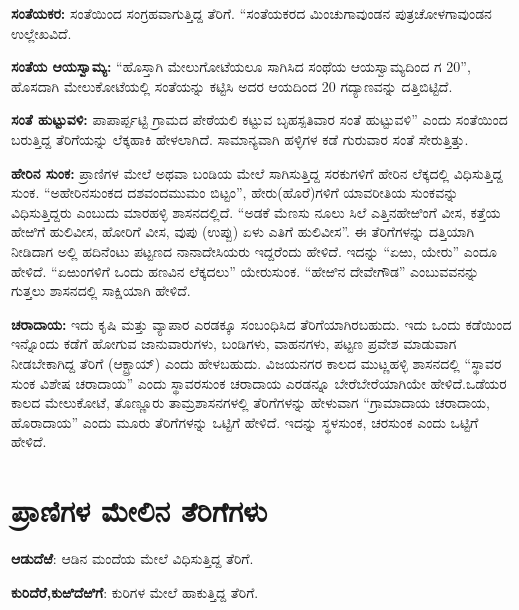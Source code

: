 \textbf{ಸಂತೆಯಕರ: } ಸಂತೆಯಿಂದ ಸಂಗ್ರಹವಾಗುತ್ತಿದ್ದ ತೆರಿಗೆ. “ಸಂತೆಯಕರದ ಮಿಂಚುಗಾವುಂಡನ ಪುತ್ರ\break ಚೋಳಗಾವುಂಡನ ಉಲ್ಲೇಖವಿದೆ.

\textbf{ಸಂತೆಯ ಆಯಸ್ವಾಮ್ಯ:} “ಹೊಸ್ತಾಗಿ ಮೇಲುಗೋಟೆಯಲೂ ಸಾಗಿಸಿದ ಸಂಥೆಯ ಆಯಸ್ವಾಮ್ಯದಿಂದ ಗ 20”, ಹೊಸದಾಗಿ ಮೇಲುಕೋಟೆಯಲ್ಲಿ ಸಂತೆಯನ್ನು ಕಟ್ಟಿಸಿ ಅದರ ಆಯದಿಂದ 20 ಗದ್ಯಾಣವನ್ನು ದತ್ತಿಬಿಟ್ಟಿದೆ.

\textbf{ಸಂತೆ ಹುಟ್ಟುವಳಿ: } ಪಾಪಾರ್ಪ್ಪಟ್ಟಿ ಗ್ರಾಮದ ಪೇಠೆಯಲಿ ಕಟ್ಟುವ ಬೃಹಸ್ಪತಿವಾರ ಸಂತೆ ಹುಟ್ಟುವಳಿ” ಎಂದು ಸಂತೆಯಿಂದ ಬರುತ್ತಿದ್ದ ತೆರಿಗೆಯನ್ನು ಲೆಕ್ಕಹಾಕಿ ಹೇಳಲಾಗಿದೆ. ಸಾಮಾನ್ಯವಾಗಿ ಹಳ್ಳಿಗಳ ಕಡೆ ಗುರುವಾರ ಸಂತೆ ಸೇರುತ್ತಿತ್ತು. 

\textbf{ಹೇರಿನ ಸುಂಕ:} ಪ್ರಾಣಿಗಳ ಮೇಲೆ ಅಥವಾ ಬಂಡಿಯ ಮೇಲೆ ಸಾಗಿಸುತ್ತಿದ್ದ ಸರಕುಗಳಿಗೆ ಹೇರಿನ ಲೆಕ್ಕದಲ್ಲಿ ವಿಧಿಸುತ್ತಿದ್ದ ಸುಂಕ. “ಅಹೇರಿನಸುಂಕದ ದಶವಂದಮುಮಂ ಬಿಟ್ಟಂ”, ಹೇರು(ಹೊರೆ)ಗಳಿಗೆ ಯಾವರೀತಿಯ ಸುಂಕವನ್ನು ವಿಧಿಸುತ್ತಿದ್ದರು ಎಂಬುದು ಮಾರಹಳ್ಳಿ ಶಾಸನದಲ್ಲಿದೆ. “ಅಡಕೆ ಮೆಣಸು ನೂಲು ಸಿಲೆ ಎತ್ತಿನಹೇಱಿಂಗೆ ವೀಸ, ಕತ್ತೆಯ ಹೇಱಿಗೆ ಹುಲಿವೀಸ, ಹೋರಿಗೆ ವೀಸ, ವುಪು (ಉಪ್ಪು) ಏಳು ಎತಿಗೆ ಹುಲಿವೀಸ”. ಈ ತೆರಿಗೆಗಳನ್ನು ದತ್ತಿಯಾಗಿ ನೀಡಿದಾಗ ಅಲ್ಲಿ ಹದಿನೆಂಟು ಪಟ್ಟಣದ ನಾನಾದೇಸಿಯರು ಇದ್ದರೆಂದು ಹೇಳಿದೆ. ಇದನ್ನು “ಏಱು, ಯೇರು” ಎಂದೂ ಹೇಳಿದೆ. “ಏಱುಂಗಳಿಗೆ ಒಂದು ಹಣವಿನ ಲೆಕ್ಕದಲು” ಯೇರುಸುಂಕ. “ಹೇಱಿನ ದೇವೇಗೌಡ” ಎಂಬುವವನನ್ನು ಗುತ್ತಲು ಶಾಸನದಲ್ಲಿ ಸಾಕ್ಷಿಯಾಗಿ ಹೇಳಿದೆ.

\textbf{ಚರಾದಾಯ: } ಇದು ಕೃಷಿ ಮತ್ತು ವ್ಯಾಪಾರ ಎರಡಕ್ಕೂ ಸಂಬಂಧಿಸಿದ ತೆರಿಗೆಯಾಗಿರಬಹುದು. ಇದು ಒಂದು ಕಡೆಯಿಂದ ಇನ್ನೊಂದು ಕಡೆಗೆ ಹೋಗುವ ಜಾನುವಾರುಗಳು, ಬಂಡಿಗಳು, ವಾಹನಗಳು, ಪಟ್ಟಣ ಪ್ರವೇಶ ಮಾಡುವಾಗ ನೀಡಬೇಕಾಗಿದ್ದ ತೆರಿಗೆ (ಆಕ್ಟ್ರಾಯ್​) ಎಂದು ಹೇಳಬಹುದು. ವಿಜಯನಗರ ಕಾಲದ ಮುಟ್ಣಹಳ್ಳಿ ಶಾಸನದಲ್ಲಿ “ಸ್ಥಾವರ ಸುಂಕ ವಿಶೇಷ ಚರಾದಾಯ” ಎಂದು ಸ್ಥಾವರಸುಂಕ ಚರಾದಾಯ ಎರಡನ್ನೂ ಬೇರೆಬೇರೆಯಾಗಿಯೇ ಹೇಳಿದೆ.ಒಡೆಯರ ಕಾಲದ ಮೇಲುಕೋಟೆ, ತೊಣ್ಣೂರು ತಾಮ್ರಶಾಸನಗಳಲ್ಲಿ ತೆರಿಗೆಗಳನ್ನು ಹೇಳುವಾಗ “ಗ್ರಾಮಾದಾಯ ಚರಾದಾಯ, ಹೊರಾದಾಯ” ಎಂದು ಮೂರು ತೆರಿಗೆಗಳನ್ನು ಒಟ್ಟಿಗೆ ಹೇಳಿದೆ. ಇದನ್ನು ಸ್ಥಳಸುಂಕ, ಚರಸುಂಕ ಎಂದು ಒಟ್ಟಿಗೆ ಹೇಳಿದೆ.


\section{ಪ್ರಾಣಿಗಳ ಮೇಲಿನ ತೆರಿಗೆಗಳು}

\textbf{ಆಡುದೆಱೆ}: ಆಡಿನ ಮಂದೆಯ ಮೇಲೆ ವಿಧಿಸುತ್ತಿದ್ದ ತೆರಿಗೆ.

\textbf{ಕುರಿದೆರೆ,}\textbf{ಕುಱಿದೆಱಿಗೆ}: ಕುರಿಗಳ ಮೇಲೆ ಹಾಕುತ್ತಿದ್ದ ತೆರಿಗೆ.

